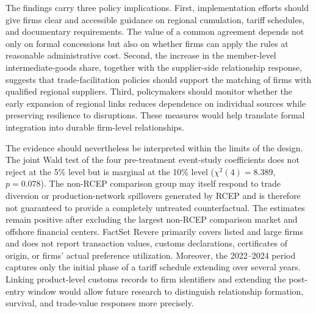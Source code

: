 \documentclass[preprint,12pt,authoryear]{elsarticle}
\begin{document}
The findings carry three policy implications. First, implementation efforts should give firms clear and accessible guidance on regional cumulation, tariff schedules, and documentary requirements. The value of a common agreement depends not only on formal concessions but also on whether firms can apply the rules at reasonable administrative cost. Second, the increase in the member-level intermediate-goods share, together with the supplier-side relationship response, suggests that trade-facilitation policies should support the matching of firms with qualified regional suppliers. Third, policymakers should monitor whether the early expansion of regional links reduces dependence on individual sources while preserving resilience to disruptions. These measures would help translate formal integration into durable firm-level relationships.

The evidence should nevertheless be interpreted within the limits of the design. The joint Wald test of the four pre-treatment event-study coefficients does not reject at the 5\% level but is marginal at the 10\% level ($\chi^2(4)=8.389$, $p=0.078$). The non-RCEP comparison group may itself respond to trade diversion or production-network spillovers generated by RCEP and is therefore not guaranteed to provide a completely untreated counterfactual. The estimates remain positive after excluding the largest non-RCEP comparison market and offshore financial centers. FactSet Revere primarily covers listed and large firms and does not report transaction values, customs declarations, certificates of origin, or firms' actual preference utilization. Moreover, the 2022--2024 period captures only the initial phase of a tariff schedule extending over several years. Linking product-level customs records to firm identifiers and extending the post-entry window would allow future research to distinguish relationship formation, survival, and trade-value responses more precisely.
\end{document}
